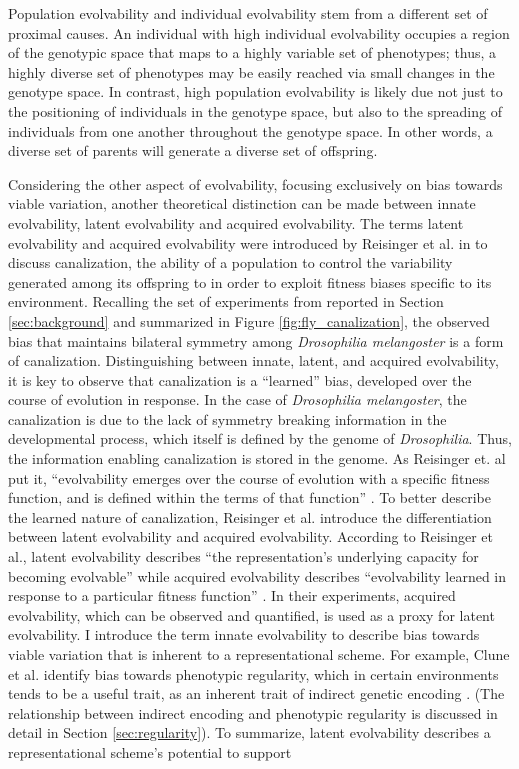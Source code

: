 Population evolvability and individual evolvability stem from a different set of proximal causes. An individual with high individual evolvability occupies a region of the genotypic space that maps to a highly variable set of phenotypes; thus, a highly diverse set of phenotypes may be easily reached via small changes in the genotype space. In contrast, high population evolvability is likely due not just to the positioning of individuals in the genotype space, but also to the spreading of individuals from one another throughout the genotype space. In other words, a diverse set of parents will generate a diverse set of offspring.


Considering the other aspect of evolvability, focusing exclusively on bias towards viable variation, another theoretical distinction can be made between innate evolvability, latent evolvability and acquired evolvability. The terms latent evolvability and acquired evolvability were introduced by Reisinger et al. in \cite{Reisinger2005TowardsEvolvability} to discuss canalization, the ability of a population to control the variability generated among its offspring to in order to exploit fitness biases specific to its environment. Recalling the set of experiments from \cite{Tuinstra1990LackDevelopment,Coyne1987LackMelanogaster} reported in Section \ref{sec:background} and summarized in Figure \ref{fig:fly_canalization}, the observed bias that maintains bilateral symmetry among \textit{Drosophilia melangoster} is a form of canalization. Distinguishing between innate, latent, and acquired evolvability, it is key to observe that canalization is a ``learned'' bias, developed over the course of evolution in response. In the case of \textit{Drosophilia melangoster}, the canalization is due to the lack of symmetry breaking information in the developmental process, which itself is defined by the genome of \textit{Drosophilia}. Thus, the information enabling canalization is stored in the genome. As Reisinger et. al put it, ``evolvability emerges over the course of evolution with a specific fitness function, and is defined within the terms of that function'' \cite{Reisinger2005TowardsEvolvability}. To better describe the learned nature of canalization, Reisinger et al. introduce the differentiation between latent evolvability and acquired evolvability. According to Reisinger et al., latent evolvability describes ``the representation’s underlying capacity for becoming evolvable'' while acquired evolvability describes ``evolvability learned in response to a particular fitness function'' \cite{Reisinger2005TowardsEvolvability}. In their experiments, acquired evolvability, which can be observed and quantified, is used as a proxy for latent evolvability. I introduce the term innate evolvability to describe bias towards viable variation that is inherent to a representational scheme. For example, Clune et al. identify bias towards phenotypic regularity, which in certain environments tends to be a useful trait, as an inherent trait of indirect genetic encoding \cite{Clune2008HowDecreases}. (The relationship between indirect encoding and phenotypic regularity is discussed in detail in Section \ref{sec:regularity}). To summarize, latent evolvability describes a representational scheme's potential to support 